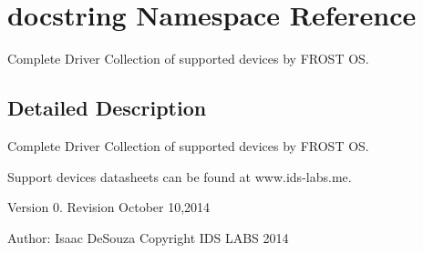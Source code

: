 \hypertarget{namespacedocstring}{}\section{docstring Namespace Reference}
\label{namespacedocstring}


Complete Driver Collection of supported devices by F\+R\+O\+S\+T O\+S.  




\subsection{Detailed Description}
Complete Driver Collection of supported devices by F\+R\+O\+S\+T O\+S. 

Support devices datasheets can be found at www.\+ids-\/labs.\+me.

Version 0. Revision October 10,2014

Author\+: Isaac De\+Souza Copyright I\+D\+S L\+A\+B\+S 2014 
